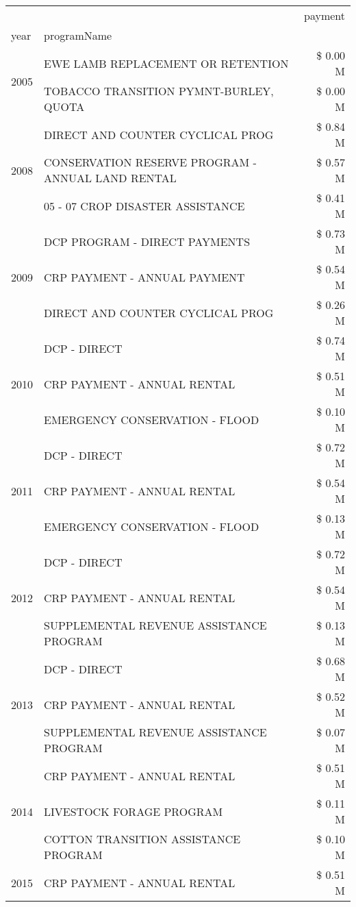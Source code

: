 \begin{tabular}{llr}
\toprule
 &  & payment \\
year & programName &  \\
\midrule
\multirow[t]{2}{*}{2005} & EWE LAMB REPLACEMENT OR RETENTION & \$ 0.00 M \\
 & TOBACCO TRANSITION PYMNT-BURLEY, QUOTA & \$ 0.00 M \\
\cline{1-3}
\multirow[t]{3}{*}{2008} & DIRECT AND COUNTER CYCLICAL PROG & \$ 0.84 M \\
 & CONSERVATION RESERVE PROGRAM - ANNUAL LAND RENTAL & \$ 0.57 M \\
 & 05 - 07 CROP DISASTER ASSISTANCE & \$ 0.41 M \\
\cline{1-3}
\multirow[t]{3}{*}{2009} & DCP PROGRAM - DIRECT PAYMENTS & \$ 0.73 M \\
 & CRP PAYMENT - ANNUAL PAYMENT & \$ 0.54 M \\
 & DIRECT AND COUNTER CYCLICAL PROG & \$ 0.26 M \\
\cline{1-3}
\multirow[t]{3}{*}{2010} & DCP - DIRECT & \$ 0.74 M \\
 & CRP PAYMENT - ANNUAL RENTAL & \$ 0.51 M \\
 & EMERGENCY CONSERVATION - FLOOD & \$ 0.10 M \\
\cline{1-3}
\multirow[t]{3}{*}{2011} & DCP - DIRECT & \$ 0.72 M \\
 & CRP PAYMENT - ANNUAL RENTAL & \$ 0.54 M \\
 & EMERGENCY CONSERVATION - FLOOD & \$ 0.13 M \\
\cline{1-3}
\multirow[t]{3}{*}{2012} & DCP - DIRECT & \$ 0.72 M \\
 & CRP PAYMENT - ANNUAL RENTAL & \$ 0.54 M \\
 & SUPPLEMENTAL REVENUE ASSISTANCE PROGRAM & \$ 0.13 M \\
\cline{1-3}
\multirow[t]{3}{*}{2013} & DCP - DIRECT & \$ 0.68 M \\
 & CRP PAYMENT - ANNUAL RENTAL & \$ 0.52 M \\
 & SUPPLEMENTAL REVENUE ASSISTANCE PROGRAM & \$ 0.07 M \\
\cline{1-3}
\multirow[t]{3}{*}{2014} & CRP PAYMENT - ANNUAL RENTAL & \$ 0.51 M \\
 & LIVESTOCK FORAGE PROGRAM & \$ 0.11 M \\
 & COTTON TRANSITION ASSISTANCE PROGRAM & \$ 0.10 M \\
\cline{1-3}
\multirow[t]{3}{*}{2015} & CRP PAYMENT - ANNUAL RENTAL & \$ 0.51 M \\

\end{tabular}
